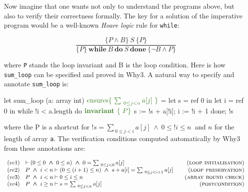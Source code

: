 \documentclass[a4paper,11pt,oneside]{article}
\theoremstyle{plain}
\newcommand{\bwedge}{\boldsymbol{~\wedge~}}
\begin{document}
	Now imagine that one wants not only to understand the programs above, but also to verify their correctness formally. 
	The key for a solution of the imperative program would be a well-known \textit{Hoare logic} rule for \texttt{while}:
\begin{small}
$$\frac { \{P \land B \}\ S\ \{P\} }
{ \{P \}\ \textbf{while}\ B\ \textbf{do}\ S\ \textbf{done}\ \{\neg B \land P\}}$$
\end{small} 
where \texttt{P} stands the loop invariant and B is the loop condition.
Here is how \texttt{sum\_loop} can be specified and proved in Why3. 
A natural way to specify and annotate \texttt{sum\_loop} is:
%	
\begin{small}
	\begin{whycode}  
let sum_loop (a: array int) 	
  $\textcolor{OliveGreen}{\text{ensures}\{~\sum_{~0 \leq j < n} a[j]~\}}$ = 
  let s = ref 0 in
  let i = ref 0 in
  while !i < a.length do
    $\textcolor{OliveGreen}{\textbf{invariant }\{~P \}}$
    s := !s + a[!i];
    i := !i + 1
  done; !s 
 	\end{whycode}
 \end{small}
where the  P is a shortcut for $ !s = \sum_{~0\leq j < i} a[j] \bwedge 0 \leq !i \leq n~$ and $n$ for the length of array \texttt{a}. 
The verification conditions computed automatically by Why3 from these annotations are:
\begin{footnotesize}
\begin{displaymath}
\begin{array}{ll@{\hspace*{2em}}r}


(vc1)
	& \vdash (0 \leq 0 \bwedge 0 \leq n) 
\bwedge 0 = \sum_{~0\leq j < 0} a[j]	
	& \textsc{(loop initialisation)} \\


(vc2)
	& P \bwedge i < n \vdash
		(0 \leq (i+1) \leq n) 
		\bwedge s + a[i] = \sum_{~0 \leq j < i+1} a[j]
	& \textsc{(loop preservation)} \\

(vc3)
	& P \bwedge i < n \vdash 0 \leq i \leq n 
	& \textsc{(array bound check)} \\

(vc4)
	& P \bwedge i \geq n \vdash s = \sum_{~0 \leq j < n} a[j] 
	& \textsc{(postcondition)} 
\end{array}
\end{displaymath}
\end{footnotesize}
\end{document}
